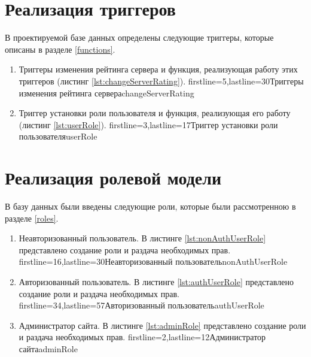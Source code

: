 \section{Реализация триггеров}

В проектируемой базе данных определены следующие триггеры, которые описаны в разделе \ref{functions}.

\begin{enumerate}
    \item Триггеры изменения рейтинга сервера и функция, реализующая работу этих триггеров (листинг \ref{lst:changeServerRating}).
            {firstline=5,lastline=30}{Триггеры изменения рейтинга сервера}{changeServerRating}{}

    \item Триггер установки роли пользователя и функция, реализующая его работу (листинг \ref{lst:userRole}).
            {firstline=3,lastline=17}{Триггер установки роли пользователя}{userRole}{}
\end{enumerate}


\section{Реализация ролевой модели}

В базу данных были введены следующие роли, которые были рассмотренною в разделе \ref{roles}.

\begin{enumerate}
    \item Неавторизованный пользователь. В листинге \ref{lst:nonAuthUserRole} представлено создание роли и раздача необходимых прав.
            {firstline=16,lastline=30}{Неавторизованный пользователь}{nonAuthUserRole}{}

    \item Авторизованный пользователь. В листинге \ref{lst:authUserRole} представлено создание роли и раздача необходимых прав.
            {firstline=34,lastline=57}{Авторизованный пользователь}{authUserRole}{}

    \item Администратор сайта. В листинге \ref{lst:adminRole} представлено создание роли и раздача необходимых прав.
            {firstline=2,lastline=12}{Администратор сайта}{adminRole}{}
\end{enumerate}


